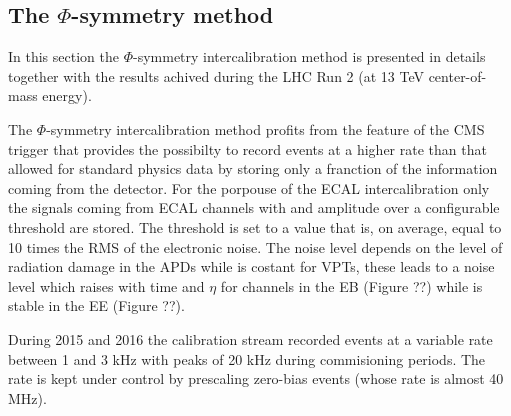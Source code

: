 \subsection{The $\Phi$-symmetry method}
\label{sec:phisym}
In this section the $\Phi $-symmetry intercalibration method is presented in details together with the results achived
during the LHC Run 2 (at 13 TeV center-of-mass energy).

The $\Phi$-symmetry intercalibration method profits from the feature of the CMS trigger that provides the possibilty
to record events at a higher rate than that allowed for standard physics data by storing only a franction of the information
coming from the detector. For the porpouse of the ECAL intercalibration only the signals coming from ECAL channels with
and amplitude over a configurable threshold are stored.
The threshold is set to a value that is, on average, equal to 10 times the RMS of the electronic noise.
The noise level depends on the level of radiation damage in the APDs while is costant for VPTs, these leads
to a noise level which raises with time and $\eta$ for channels in the EB (Figure ??) while is stable in the EE (Figure ??).

During 2015 and 2016 the calibration stream recorded events at a variable rate between 1 and 3 kHz with peaks of 20 kHz during
commisioning periods. The rate is kept under control by prescaling zero-bias events (whose rate is almost 40 MHz).

